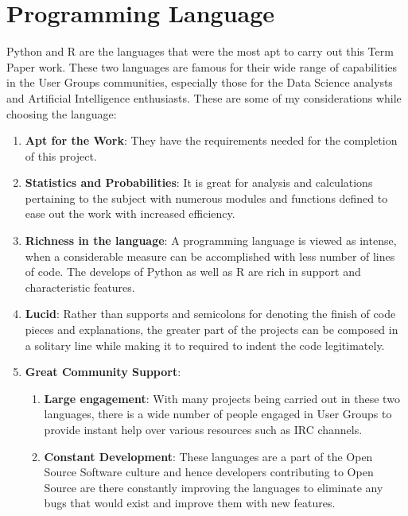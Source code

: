 \section {Programming Language}
\label{sec:python}
Python and R are the languages that were the most apt to carry out this Term Paper work. These two languages are famous for their wide range of capabilities in the User Groups communities, especially those for the Data Science analysts and Artificial Intelligence enthusiasts. These are some of my considerations while choosing the language: 
\begin{enumerate}
\item \textbf{Apt for the Work}: They have the requirements needed for the completion of this project. 
\item \textbf{Statistics and Probabilities}: It is great for analysis and calculations pertaining to the subject with numerous modules and functions defined to ease out the work with increased efficiency.
\item \textbf{Richness in the language}: A programming language is viewed as intense, when a considerable measure can be accomplished with less number of lines of code. The develops of Python as well as R are rich in support and characteristic features. 
\item \textbf{Lucid}: Rather than supports and semicolons for denoting the finish of code pieces and explanations, the greater part of the projects can be composed in a solitary line while making it to required to indent the code legitimately.
\item \textbf{Great Community Support}: 
    \begin{enumerate}
    \item \textbf{Large engagement}: With many projects being carried out in these two languages, there is a wide number of people engaged in User Groups to provide instant help over various resources such as IRC channels.
    \item \textbf{Constant Development}: These languages are a part of the Open Source Software culture and hence developers contributing to Open Source are there constantly improving the languages to eliminate any bugs that would exist and improve them with new features. 
    \end{enumerate}
\end{enumerate}


